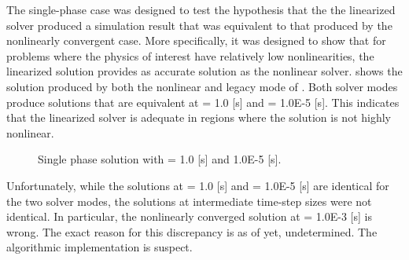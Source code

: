 The single-phase case was designed to test the hypothesis that the the linearized solver produced a simulation result that was equivalent to that produced by the nonlinearly convergent case.
More specifically, it was designed to show that for problems where the physics of interest have relatively low nonlinearities, the linearized solution provides as accurate solution as the nonlinear solver.
 shows the solution produced by both the nonlinear and legacy mode of \cobra{}.
Both solver modes produce solutions that are equivalent at \dtmax{} = 1.0 [s] and \dtmax{} = 1.0E-5 [s].
This indicates that the linearized solver is adequate in regions where the solution is not highly nonlinear.

\begin{figure}[h!t]
\centering
{}
\caption[Single phase solution at \dtmax{} = 1.0 {[s]}and 1.0E-5 {[s]}]{Single phase solution with \dtmax{} = 1.0 {[s]} and 1.0E-5 {[s]}.}
\label{fig:single_compare_1}
\end{figure}

Unfortunately, while the solutions at \dtmax{} = 1.0 [s] and \dtmax{} = 1.0E-5 [s] are identical for the two solver modes, the solutions at intermediate time-step sizes were not identical.
In particular, the nonlinearly converged solution at \dtmax{} = 1.0E-3 [s] is wrong.
The exact reason for this discrepancy is as of yet, undetermined.
The algorithmic implementation is suspect.

